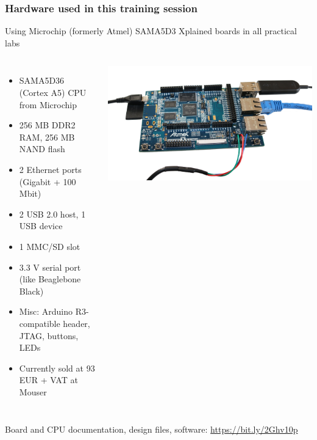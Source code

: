 \begin{frame}
\frametitle{Hardware used in this training session}
  Using Microchip (formerly Atmel) SAMA5D3 Xplained boards in all practical labs
  \begin{columns}
    {\footnotesize
    \begin{itemize}
	\item SAMA5D36 (Cortex A5) CPU from Microchip
	\item 256 MB DDR2 RAM, 256 MB NAND flash
	\item 2 Ethernet ports (Gigabit + 100 Mbit)
	\item 2 USB 2.0 host, 1 USB device
	\item 1 MMC/SD slot
	\item 3.3 V serial port (like Beaglebone Black)
	\item Misc: Arduino R3-compatible header, JTAG, buttons, LEDs
	\item Currently sold at 93 EUR + VAT at Mouser
    \end{itemize}
    }
    \includegraphics[width=\textwidth]{slides/xplained-board/xplained-board.png}
  \end{columns}
  \vspace{1em}
  {\small
  Board and CPU documentation, design files, software:
  \url{https://bit.ly/2Ghv10p}
  }
\end{frame}
